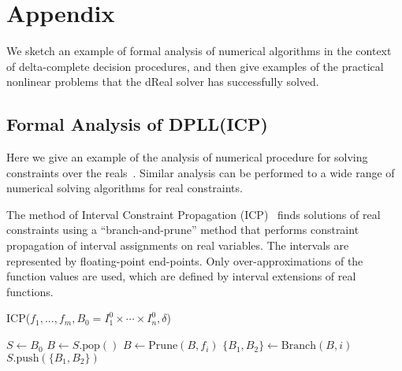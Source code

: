 \documentclass[10pt]{article}
\theoremstyle{definition}
\begin{document}



\section*{Appendix}

We sketch an example of formal analysis of numerical algorithms in the context of delta-complete decision procedures, and then give examples of the practical nonlinear problems that the dReal solver has successfully solved. 

\subsection*{Formal Analysis of DPLL(ICP)}
Here we give an example of the analysis of numerical procedure for solving constraints over the reals~\cite{DBLP:conf/cade/GaoAC12}. Similar analysis can be performed to a wide range of numerical solving algorithms for real constraints. 

The method of Interval Constraint Propagation (ICP)~\cite{handbookICP} finds solutions of real constraints using a ``branch-and-prune'' method that performs constraint propagation of interval assignments on real variables. The intervals are represented by floating-point end-points. Only over-approximations of the function values are used, which are defined by interval extensions of real functions.
\begin{algorithm}
\caption{ICP($f_1,...,f_m, B_0 = I_1^0\times\cdots\times I_n^0, \delta$)}\label{icpalgo}
\begin{algorithmic}[1]
\Statex
    \State $S \gets B_0$
        \State $B \gets S.\mathrm{pop}()$
        \State $B \gets \mathrm{Prune}(B, f_i)$
        \EndWhile
                \State $\{B_1,B_2\} \gets \mathrm{Branch}(B, i)$
                \State $S.\mathrm{push}(\{B_1,B_2\})$
            \Else
                \State {}
            \EndIf
        \EndIf
    \EndWhile
    \State {}
\end{algorithmic}\label{algo1}
\end{algorithm}
\end{document}
